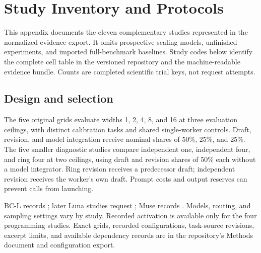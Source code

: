 \section{Study Inventory and Protocols}
\label{app:protocol}
This appendix documents the eleven complementary studies represented in the
normalized evidence export. It omits prospective scaling models, unfinished experiments, and
imported full-benchmark baselines. Study codes below identify the complete
cell table in the versioned repository and the machine-readable evidence bundle.
Counts are completed scientific trial keys, not request attempts.

\subsection{Design and selection}
The five original grids evaluate widths 1, 2, 4, 8, and 16 at three evaluation
ceilings, with distinct calibration tasks and shared single-worker controls.
Draft, revision, and model integration receive nominal shares of 50\%, 25\%,
and 25\%. The five smaller diagnostic studies compare independent one,
independent four, and ring four at two ceilings, using draft and revision
shares of 50\% each without a model integrator. Ring revision receives a
predecessor draft; independent revision receives the worker's own draft.
Prompt costs and output reserves can prevent calls from launching.

BC-L records ; later Luna studies request
; Muse records
. Models, routing, and sampling settings
vary by study. Recorded activation is available only for the four programming
studies. Exact grids, recorded configurations, task-source revisions,
excerpt limits, and available dependency records are in the repository's
Methods document and configuration export.

